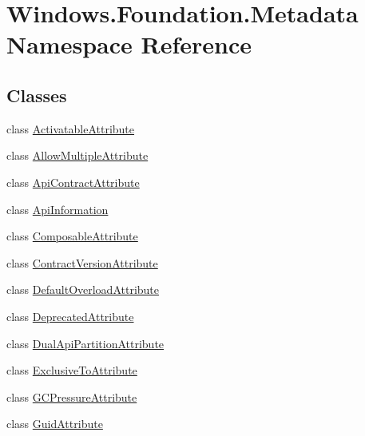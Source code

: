 \hypertarget{namespace_windows_1_1_foundation_1_1_metadata}{}\section{Windows.\+Foundation.\+Metadata Namespace Reference}
\label{namespace_windows_1_1_foundation_1_1_metadata}
\subsection*{Classes}
\begin{DoxyCompactItemize}
\item 
class \hyperlink{class_windows_1_1_foundation_1_1_metadata_1_1_activatable_attribute}{Activatable\+Attribute}
\item 
class \hyperlink{class_windows_1_1_foundation_1_1_metadata_1_1_allow_multiple_attribute}{Allow\+Multiple\+Attribute}
\item 
class \hyperlink{class_windows_1_1_foundation_1_1_metadata_1_1_api_contract_attribute}{Api\+Contract\+Attribute}
\item 
class \hyperlink{class_windows_1_1_foundation_1_1_metadata_1_1_api_information}{Api\+Information}
\item 
class \hyperlink{class_windows_1_1_foundation_1_1_metadata_1_1_composable_attribute}{Composable\+Attribute}
\item 
class \hyperlink{class_windows_1_1_foundation_1_1_metadata_1_1_contract_version_attribute}{Contract\+Version\+Attribute}
\item 
class \hyperlink{class_windows_1_1_foundation_1_1_metadata_1_1_default_overload_attribute}{Default\+Overload\+Attribute}
\item 
class \hyperlink{class_windows_1_1_foundation_1_1_metadata_1_1_deprecated_attribute}{Deprecated\+Attribute}
\item 
class \hyperlink{class_windows_1_1_foundation_1_1_metadata_1_1_dual_api_partition_attribute}{Dual\+Api\+Partition\+Attribute}
\item 
class \hyperlink{class_windows_1_1_foundation_1_1_metadata_1_1_exclusive_to_attribute}{Exclusive\+To\+Attribute}
\item 
class \hyperlink{class_windows_1_1_foundation_1_1_metadata_1_1_g_c_pressure_attribute}{G\+C\+Pressure\+Attribute}
\item 
class \hyperlink{class_windows_1_1_foundation_1_1_metadata_1_1_guid_attribute}{Guid\+Attribute}
\item 

\end{DoxyCompactItemize}
